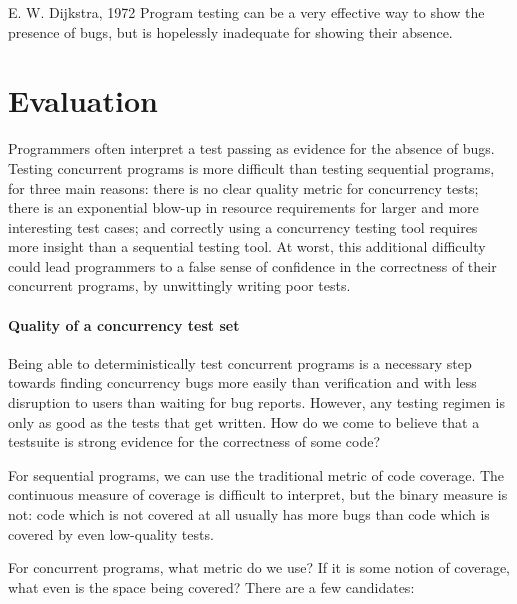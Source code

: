 \begin{bquote}{E. W. Dijkstra, 1972\nocite{ewd340}}
  Program testing can be a very effective way to show the presence of
  bugs, but is hopelessly inadequate for showing their absence.
\end{bquote}

\blindtext

\section{Evaluation}
\label{sec:conclusions-evaluation}

Programmers often interpret a test passing as evidence for the absence
of bugs.  Testing concurrent programs is more difficult than testing
sequential programs, for three main reasons: there is no clear quality
metric for concurrency tests; there is an exponential blow-up in
resource requirements for larger and more interesting test cases; and
correctly using a concurrency testing tool requires more insight than
a sequential testing tool.  At worst, this additional difficulty could
lead programmers to a false sense of confidence in the correctness of
their concurrent programs, by unwittingly writing poor tests.

\paragraph{Quality of a concurrency test set}
Being able to deterministically test concurrent programs is a
necessary step towards finding concurrency bugs more easily than
verification and with less disruption to users than waiting for bug
reports.  However, any testing regimen is only as good as the tests
that get written.  How do we come to believe that a testsuite is
strong evidence for the correctness of some code?

For sequential programs, we can use the traditional metric of code
coverage.  The continuous measure of coverage is difficult to
interpret, but the binary measure is not: code which is not covered at
all usually has more bugs than code which is covered by even
low-quality tests\cite{ahmed2016}.

For concurrent programs, what metric do we use?  If it is some notion
of coverage, what even is the space being covered?  There are a few
candidates:

